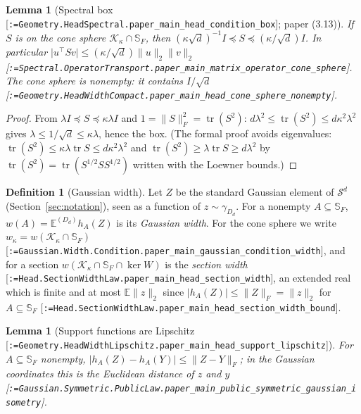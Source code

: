 \documentclass[11pt]{article}
\makeatletter
\newcommand{\formal@break}[1]{\@tfor\formal@tok:=#1\do{%
  \formal@tok
  \expandafter\ifx\formal@tok.\allowbreak\else
  \expandafter\ifx\formal@tok\_\allowbreak\fi\fi}}
\DeclareRobustCommand{\formal}[1]{\textnormal{[\texttt{\small\formal@break{#1}}]}}
\newcommand{\E}{\mathbb{E}}
\newcommand{\Sym}{\mathcal{S}}
\newcommand{\norm}[1]{\lVert #1\rVert}
\newcommand{\abs}[1]{\lvert #1\rvert}
\newcommand{\tr}{\operatorname{tr}}
\newcommand{\Fro}{F}
\newcommand{\sqd}{\sqrt{d}}
\newcommand{\Id}{I}
\newcommand{\cone}{\mathcal{K}}
\newcommand{\gauss}{\gamma}
\newcommand{\Dd}{D}
\theoremstyle{plain}
\newtheorem{lemma}[theorem]{Lemma}
\theoremstyle{definition}
\newtheorem{definition}[theorem]{Definition}
\makeatother
\begin{document}
\begin{lemma}[Spectral box \formal{Geometry.HeadSpectral.paper\_main\_head\_condition\_box}; paper (3.13)]\label{lem:box}
If $S$ is on the cone sphere $\cone_\kappa \cap \mathbb{S}_\Fro$, then
$(\kappa\sqd)^{-1}\Id \preceq S \preceq (\kappa/\sqd)\Id$. In particular
$\abs{u^{\top}Sv} \le (\kappa/\sqd)\norm{u}_2\norm{v}_2$
\formal{Spectral.OperatorTransport.paper\_main\_matrix\_operator\_cone\_sphere}.
The cone sphere is nonempty: it contains $\Id/\sqd$
\formal{Geometry.HeadWidthCompact.paper\_main\_head\_cone\_sphere\_nonempty}.
\end{lemma}

\begin{proof}
From $\lambda\Id \preceq S \preceq \kappa\lambda\Id$ and
$1 = \norm{S}_\Fro^2 = \tr(S^2)$: $d\lambda^2 \le \tr(S^2) \le d\kappa^2\lambda^2$
gives $\lambda \le 1/\sqd \le \kappa\lambda$, hence the box. (The formal
proof avoids eigenvalues: $\tr(S^2) \le \kappa\lambda\tr S \le d\kappa^2\lambda^2$
and $\tr(S^2) \ge \lambda \tr S \ge d\lambda^2$ by $\tr(S^2) = \tr(S^{1/2}SS^{1/2})$
written with the Loewner bounds.)
\end{proof}

\begin{definition}[Gaussian width]
Let $Z$ be the standard Gaussian element of $\Sym^d$ (Section~\ref{sec:notation}),
seen as a function of $z \sim \gauss_{\Dd_d}$. For a nonempty $A \subseteq \mathbb{S}_\Fro$,
$w(A) = \E^{(\Dd_d)} h_A(Z)$ is its \emph{Gaussian width}. For the cone
sphere we write $w_\kappa = w(\cone_\kappa\cap\mathbb{S}_\Fro)$
\formal{Gaussian.Width.Condition.paper\_main\_gaussian\_condition\_width},
and for a section $w(\cone_\kappa \cap \mathbb{S}_\Fro \cap \ker W)$ is the
\emph{section width} \formal{Head.SectionWidthLaw.paper\_main\_head\_section\_width},
an extended real which is finite and at most $\E\norm{z}_2$ since
$\abs{h_A(Z)} \le \norm{Z}_\Fro = \norm{z}_2$ for $A \subseteq \mathbb{S}_\Fro$
\formal{Head.SectionWidthLaw.paper\_main\_head\_section\_width\_bound}.
\end{definition}

\begin{lemma}[Support functions are Lipschitz \formal{Geometry.HeadWidthLipschitz.paper\_main\_head\_support\_lipschitz}]\label{lem:support_lip}
For $A \subseteq \mathbb{S}_\Fro$ nonempty, $\abs{h_A(Z) - h_A(Y)} \le \norm{Z - Y}_\Fro$;
in the Gaussian coordinates this is the Euclidean distance of $z$ and $y$
\formal{Gaussian.Symmetric.PublicLaw.paper\_main\_public\_symmetric\_gaussian\_isometry}.
\end{lemma}
\end{document}
